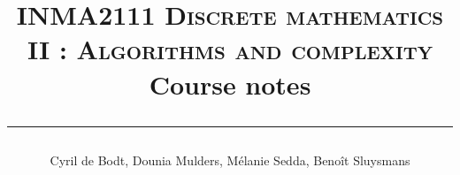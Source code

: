 


\title{\textsc{ \normalsize INMA2111 Discrete mathematics II : Algorithms and complexity} \\ Course notes  \vspace{0.5cm} \hrule height 1pt}
\author{Cyril de Bodt, Dounia Mulders, Mélanie Sedda, Benoît Sluysmans}





\maketitle










